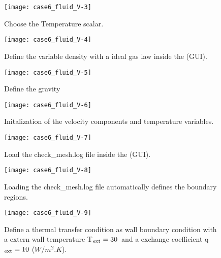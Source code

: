 \begin{figure}[h!]
\begin{center}
\texttt{[image: case6\_fluid\_V-3]}
\caption{Choose the Temperature scalar.}
\label{fig1_e5}
\end{center}
\end{figure}
\newpage

\begin{figure}[h!]
\begin{center}
\texttt{[image: case6\_fluid\_V-4]}
\caption{Define the variable density with a ideal gas law inside the \CS (GUI).}
\label{fig1_e5}
\end{center}
\end{figure}

\begin{figure}[h!]
\begin{center}
\texttt{[image: case6\_fluid\_V-5]}
\caption{Define the gravity}
\label{fig1_e5}
\end{center}
\end{figure}
\newpage

\begin{figure}[h!]
\begin{center}
\texttt{[image: case6\_fluid\_V-6]}
\caption{Initalization of the velocity components and temperature variables.}
\label{fig1_e5}
\end{center}
\end{figure}

\begin{figure}[h!]
\begin{center}
\texttt{[image: case6\_fluid\_V-7]}
\caption{Load the check\_mesh.log file inside the \CS (GUI).}
\label{fig1_e5}
\end{center}
\end{figure}

\newpage

\begin{figure}[h!]
\begin{center}
\texttt{[image: case6\_fluid\_V-8]}
\caption{Loading the check\_mesh.log file automatically defines the boundary regions.}
\label{fig1_e5}
\end{center}
\end{figure}

\begin{figure}[h!]
\begin{center}
\texttt{[image: case6\_fluid\_V-9]}
\caption{Define a thermal transfer condition as wall boundary condition with a extern wall
temperature T$_{\mbox{\scriptsize ext}} = 30 $\degresC ~and a exchange coefficient
q$_{\mbox{\scriptsize ext}} = 10$ ($W/m^2.K$).}
\label{fig1_e5}
\end{center}
\end{figure}

